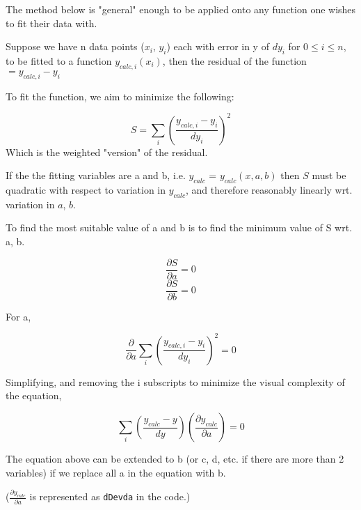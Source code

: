 \documentclass[a4paper, 12pt]{article}
\begin{document}
The method below is "general" enough to be applied onto any function one wishes to fit their data with.

Suppose we have n data points ($x_i$, $y_i$) each with error in y of $dy_i$ for $0 \leq i \leq n$, to be fitted to a function $y_{calc,i}(x_i)$, then the residual of the function $= y_{calc,i} - y_i$

To fit the function, we aim to minimize the following:

\[S = \sum_i (\frac{y_{calc,i} - y_i}{dy_i})^2\]
Which is the weighted "version" of the residual.

If the the fitting variables are a and b, i.e. $y_{calc}$ = $y_{calc}(x,a,b)$ then $S$ must be quadratic with respect to variation in $y_{calc}$, and therefore reasonably linearly wrt. variation in $a$, $b$.

To find the most suitable value of a and b is to find the minimum value of S wrt. a, b.

\[\frac{\partial S}{\partial a} = 0\] 
\[\frac{\partial S}{\partial b} = 0\] 

For a,

\[\frac{\partial}{\partial a}\sum_i (\frac{y_{calc,i} - y_i}{dy_i})^2 = 0\]

Simplifying, and removing the i subscripts to minimize the visual complexity of the equation,

\[\sum_i (\frac{y_{calc} - y}{dy})
(\frac{\partial y_{calc}}{\partial a}) = 0\]

The equation above can be extended to b (or c, d, etc. if there are more than 2 variables) if we replace all a in the equation with b.

($\frac{\partial y_{calc}}{\partial a}$ is represented as 
\texttt{dDevda} in the code.)
\end{document}
